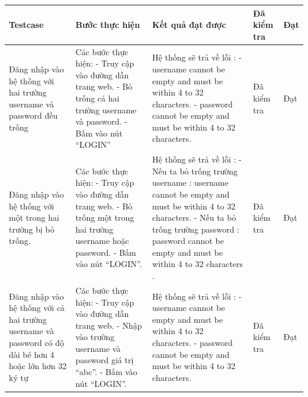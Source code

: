 \documentclass[a4paper]{article}
\begin{document}
\begin{longtable}{ | p{} |p{} | p{}  | p{}  | p{}  | } 
\hline
\textbf{Testcase}& \textbf{Bước thực hiện}& \textbf{Kết quả đạt được} & \textbf{Đã kiểm tra}& \textbf{Đạt} \\ 
\hline
\hline
Đăng nhập vào hệ thống với hai trường username và password đều trống &
Các bước thực hiện: \newline
- Truy cập vào đường dẫn trang web. \newline
- Bỏ trống cả hai trường username và password. \newline
- Bấm vào nút “LOGIN”
&
Hệ thống sẽ trả về lỗi : \newline
- username cannot be empty and must be within 4 to 32 characters. \newline
- password cannot be empty and must be within 4 to 32 characters.
&
Đã kiểm tra &
Đạt \\

\hline
Đăng nhập vào hệ thống với một trong hai trường bị bỏ trống. &
Các bước thực hiện: \newline
- Truy cập vào đường dẫn trang web. \newline
- Bỏ trống một trong hai trường username hoặc password.  \newline
- Bấm vào nút “LOGIN”. 
&
Hệ thống sẽ trả về lỗi : \newline
- Nếu ta bỏ trống trường username : username cannot be empty and must be within 4 to 32 characters. \newline
- Nếu ta bỏ trống trường password : password cannot be empty and must be within 4 to 32 characters . \newline
&
Đã kiểm tra &
Đạt \\

\hline
Đăng nhập vào hệ thống với cả hai trường username và password có độ dài bé hơn 4 hoặc lớn hơn 32 ký tự &
Các bước thực hiện: \newline
- Truy cập vào đường dẫn trang web. \newline
- Nhập vào trường username và password giá trị “abc”.  \newline
- Bấm vào nút “LOGIN”.
&
Hệ thống sẽ trả về lỗi : \newline
- username cannot be empty and must be within 4 to 32 characters. \newline
- password cannot be empty and must be within 4 to 32 characters. \newline
&
Đã kiểm tra &
Đạt \\


\end{longtable}
\end{document}
